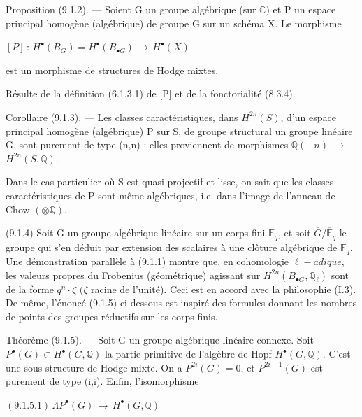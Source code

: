 \documentclass[11pt,twoside]{article}
\newcommand{\DFormula}[1]{%
  \par\smallskip\noindent\hspace*{0pt}\(\displaystyle #1\)\par\smallskip
}
\begin{document}
Proposition (9.1.2). — Soient G un groupe algébrique (sur \(\mathbb{C})\) et P un espace principal homogène (algébrique) de groupe G sur un schéma X. Le morphisme\par
\par\medskip
\DFormula{[P]\,:\,H^{\bullet }(B_{G})=H^{\bullet }(B_{\bullet G})\,\to \,H^{\bullet }(X)}
\par\medskip
est un morphisme de structures de Hodge mixtes.\par
\par\medskip
Résulte de la définition (6.1.3.1) de [P] et de la fonctorialité (8.3.4).\par
\par\medskip
Corollaire (9.1.3). — Les classes caractéristiques, dans \(H^{2n}(S)\), d’un espace principal homogène (algébrique) P sur S, de groupe structural un groupe linéaire G, sont purement de type (n,n) : elles proviennent de morphismes \(\mathbb{Q}(−n)\) \(\to \) \(H^{2n}(S,\mathbb{Q})\).\par
\par\medskip
Dans le cas particulier où S est quasi-projectif et lisse, on sait que les classes caractéristiques de P sont même algébriques, i.e. dans l’image de l’anneau de Chow \((\otimes \mathbb{Q})\).\par
\par\medskip
(9.1.4) Soit G un groupe algébrique linéaire sur un corps fini \(𝔽_{q}\), et soit \(\overline{G}/\overline{𝔽}_{q}\) le groupe qui s’en déduit par extension des scalaires à une clôture algébrique de \(𝔽_{q}\). Une démonstration parallèle à (9.1.1) montre que, en cohomologie \(\ell -adique\), les valeurs propres du Frobenius (géométrique) agissant sur \(H^{2n}(B_{\bullet \overline{G}},\mathbb{Q}_{\ell })\) sont de la forme \(q^{n}·\zeta \) \((\zeta \) racine de l’unité). Ceci est en accord avec la philosophie (I.3). De même, l’énoncé (9.1.5) ci-dessous est inspiré des formules donnant les nombres de points des groupes réductifs sur les corps finis.\par
\par\medskip
Théorème (9.1.5). — Soit G un groupe algébrique linéaire connexe. Soit \(P^{\bullet }(G)\subset H^{\bullet }(G,\mathbb{Q})\) la partie primitive de l’algèbre de Hopf \(H^{\bullet }(G,\mathbb{Q})\). C’est une sous-structure de Hodge mixte. On a \(P^{2i}(G)=0\), et \(P^{2i−1}(G)\) est purement de type (i,i). Enfin, l’isomorphisme\par
\par\medskip
\DFormula{(9.1.5.1)\,\Lambda P^{\bullet }(G)\,\to \,H^{\bullet }(G,\mathbb{Q})}
\end{document}
